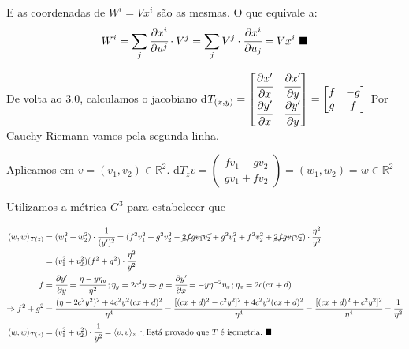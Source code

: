 \documentclass[10pt,a4paper]{article}
\begin{document}
		E as coordenadas de $W^i = V x^i$ s\~ao as mesmas. O que equivale a:
		\begin{align*}
		W^i = \sum_j \cfrac{\partial x^i}{\partial u^j} \cdot V^j = \sum_j V^j \cdot \cfrac{\partial x^i}{\partial u_j} = Vx^i \,\,\blacksquare
		\end{align*}

		\vspace{3mm}

		De volta ao 3.0, calculamos o jacobiano d$T_{(x,y)} = \left[ \begin{matrix} \cfrac{\partial x'}{\partial x} & \cfrac{\partial x'}{\partial y} \\ \cfrac{\partial y'}{\partial x} & \cfrac{\partial y'}{\partial y} \end{matrix} \right] = \left[ \begin{matrix} f & -g \\ g & f \end{matrix} \right]$ Por Cauchy-Riemann vamos pela segunda linha.

		Aplicamos em $v = (v_1, v_2) \in \mathbb{R}^2$. d$T_z v = \left( \begin{matrix} f v_1 - g v_2 \\ g v_1 + f v_2 \end{matrix} \right) = (w_1, w_2) = w \in \mathbb{R}^2$

		\vspace{3mm}

		Utilizamos a m\'etrica $G^3$ para estabelecer que

		\begin{align*}
		\langle w, w \rangle_{T(z)} &= (w_1^2 + w_2^2) \cdot \cfrac{1}{(y')^2} = (f^2 v_1^2 + g^2 v_2^2 - \cancel{2fg v_1 v_2} + g^2 v_1^2 + f^2 v_2^2 + \cancel{2fg v_1 v_2}) \cdot \cfrac{\eta^2}{y^2} \\
		&= (v_1^2 + v_2^2)(f^2 + g^2) \cdot \cfrac{\eta^2}{y^2} \\
		f &= \cfrac{\partial y'}{\partial y} = \cfrac{\eta - y \eta_y}{\eta^2} \,; \eta_y = 2 c^2 y \Rightarrow g = \cfrac{\partial y'}{\partial x} = -y\eta^{-2} \eta_x \,; \eta_x = 2c(cx + d) \\
		\Rightarrow f^2 + g^2 &= \cfrac{(\eta - 2c^2 y^2)^2 + 4c^2 y^2 (cx + d)^2}{\eta^4} = \cfrac{[(cx + d)^2 - c^2 y^2]^2 + 4c^2 y^2 (cx + d)^2}{\eta^4} = \cfrac{[(cx + d)^2 + c^2 y^2]^2}{\eta^4} = \cfrac{1}{\eta^2} \\
		\langle w, w \rangle_{T(z)} &= (v_1^2 + v_2^2) \cdot \cfrac{1}{y^2} = \langle v, v \rangle_z \therefore \text{Est\'a provado que }T \text{ \'e isometria.} \,\,\blacksquare
		\end{align*}
\end{document}
